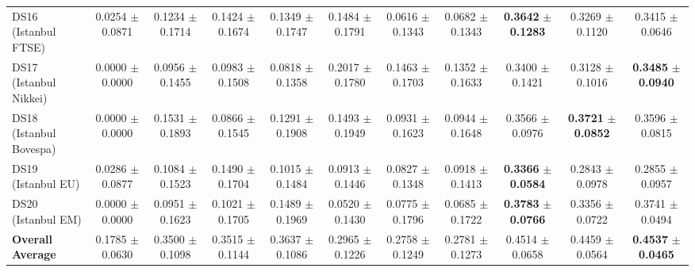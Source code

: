 \begin{table}[t]
{{\begin{tabular}{lcccccccccc}
DS16 (Istanbul FTSE) & 0.0254 $\pm$ 0.0871 & 0.1234 $\pm$ 0.1714 & 0.1424 $\pm$ 0.1674 & 0.1349 $\pm$ 0.1747 & 0.1484 $\pm$ 0.1791 & 0.0616 $\pm$ 0.1343 & 0.0682 $\pm$ 0.1343 & \textbf{0.3642} $\pm$ \textbf{0.1283} & 0.3269 $\pm$ 0.1120 & 0.3415 $\pm$ 0.0646 \\
DS17 (Istanbul Nikkei) & 0.0000 $\pm$ 0.0000 & 0.0956 $\pm$ 0.1455 & 0.0983 $\pm$ 0.1508 & 0.0818 $\pm$ 0.1358 & 0.2017 $\pm$ 0.1780 & 0.1463 $\pm$ 0.1703 & 0.1352 $\pm$ 0.1633 & 0.3400 $\pm$ 0.1421 & 0.3128 $\pm$ 0.1016 & \textbf{0.3485} $\pm$ \textbf{0.0940} \\
DS18 (Istanbul Bovespa) & 0.0000 $\pm$ 0.0000 & 0.1531 $\pm$ 0.1893 & 0.0866 $\pm$ 0.1545 & 0.1291 $\pm$ 0.1908 & 0.1493 $\pm$ 0.1949 & 0.0931 $\pm$ 0.1623 & 0.0944 $\pm$ 0.1648 & 0.3566 $\pm$ 0.0976 & \textbf{0.3721} $\pm$ \textbf{0.0852} & 0.3596 $\pm$ 0.0815 \\
DS19 (Istanbul EU) & 0.0286 $\pm$ 0.0877 & 0.1084 $\pm$ 0.1523 & 0.1490 $\pm$ 0.1704 & 0.1015 $\pm$ 0.1484 & 0.0913 $\pm$ 0.1446 & 0.0827 $\pm$ 0.1348 & 0.0918 $\pm$ 0.1413 & \textbf{0.3366} $\pm$ \textbf{0.0584} & 0.2843 $\pm$ 0.0978 & 0.2855 $\pm$ 0.0957 \\
DS20 (Istanbul EM) & 0.0000 $\pm$ 0.0000 & 0.0951 $\pm$ 0.1623 & 0.1021 $\pm$ 0.1705 & 0.1489 $\pm$ 0.1969 & 0.0520 $\pm$ 0.1430 & 0.0775 $\pm$ 0.1796 & 0.0685 $\pm$ 0.1722 & \textbf{0.3783} $\pm$ \textbf{0.0766} & 0.3356 $\pm$ 0.0722 & 0.3741 $\pm$ 0.0494 \\
\midrule
\textbf{Overall Average} & 0.1785 $\pm$ 0.0630 & 0.3500 $\pm$ 0.1098 & 0.3515 $\pm$ 0.1144 & 0.3637 $\pm$ 0.1086 & 0.2965 $\pm$ 0.1226 & 0.2758 $\pm$ 0.1249 & 0.2781 $\pm$ 0.1273 & 0.4514 $\pm$ 0.0658 & 0.4459 $\pm$ 0.0564 & \textbf{0.4537} $\pm$ \textbf{0.0465} \\
\bottomrule
\end{tabular}%
}%
}
\end{table}
